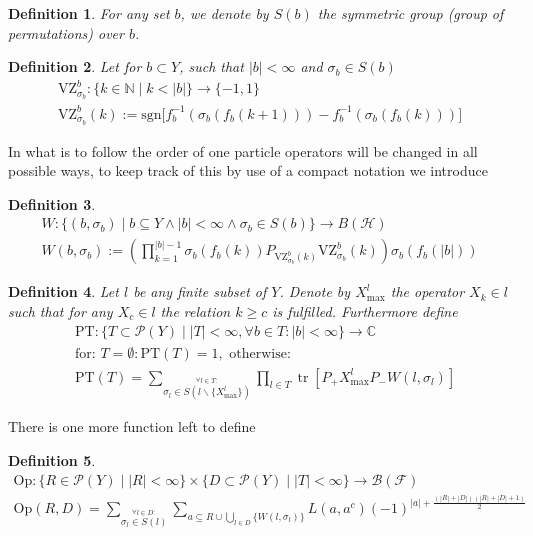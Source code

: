 \documentclass[b5paper,draft,openbib,12pt]{memoir}
\newtheorem{Def}{Definition}[section]
\DeclareMathOperator{\tr}{tr}
\begin{document}
\begin{Def}
For any set \(b\), we denote by \(S(b)\) the symmetric group (group of permutations) over \(b\).
\end{Def}

\begin{Def}
Let for  \(b\subset Y\), such that \(|b|<\infty\) and \(\sigma_b \in S(b)\)
\begin{align*}
\text{VZ}^b_{\sigma_b}: \{k\in\mathbb{N}\mid k<|b|\} \rightarrow \{-1,1\}\\
\text{VZ}^b_{\sigma_b}(k):=\text{sgn}\big[f_b^{-1}(\sigma_b(f_b(k+1))) - f_b^{-1}(\sigma_b(f_b(k)))  \big]
\end{align*}
\end{Def}

In what is to follow the order of one particle operators will be changed in all possible ways, to keep track of this by
use of a compact notation we introduce
\begin{Def}
\begin{align*}
W: \{(b,\sigma_b) \mid b\subseteq Y \wedge |b|<\infty \wedge \sigma_b \in S(b) \} \rightarrow B(\mathcal{H})\\
W(b,\sigma_b):= \left( \prod_{k=1}^{|b|-1} \sigma_{b}(f_b(k)) P_{\text{VZ}_{\sigma_b}^b(k)} \text{VZ}_{\sigma_b}^b(k) \right) \sigma_b (f_b(|b|))
\end{align*}
\end{Def}

\begin{Def} Let \(l\) be any finite subset of \(Y\). Denote by \(X^l_{\text{max}}\) the operator \(X_k\in l \)
such that for any \(X_c\in l \) the relation \(k\ge c\) is fulfilled. Furthermore define
\begin{align*}
&\text{PT}: \{T\subset \mathcal{P}(Y)\mid |T|<\infty, \forall b\in T: |b|<\infty\}\rightarrow \mathbb{C}\\
&\text{for: } T=\emptyset: \text{PT}(T)=1, \text{ otherwise: }\\
&\text{PT}(T)=\sum_{\stackrel{\forall l \in T:}{\sigma_l \in S(l \backslash \{X_{\text{max}}^l\})}} \prod_{l\in T} 
\tr [P_+ X^l_{\text{max}} P_- W(l, \sigma_l)]
\end{align*}
\end{Def}

There is one more function left to define
\begin{Def}
\begin{align*}
\text{Op}:  \{R\in \mathcal{P}(Y)\mid |R|<\infty\} \times \{D\subset \mathcal{P}(Y)\mid |T|<\infty\}\rightarrow \mathcal{B}(\mathcal{F})\\
\text{Op}(R,D)=\sum_{\stackrel{\forall l \in D:}{\sigma_l \in S(l)}} \sum_{a \subseteq R \cup \bigcup_{l\in D} \{W(l,\sigma_l)\}} L(a,a^c)(-1)^{|a|+  \frac{(|R| + |D|)(|R|+|D|+1)}{2}}
\end{align*}
\end{Def}
\end{document}
